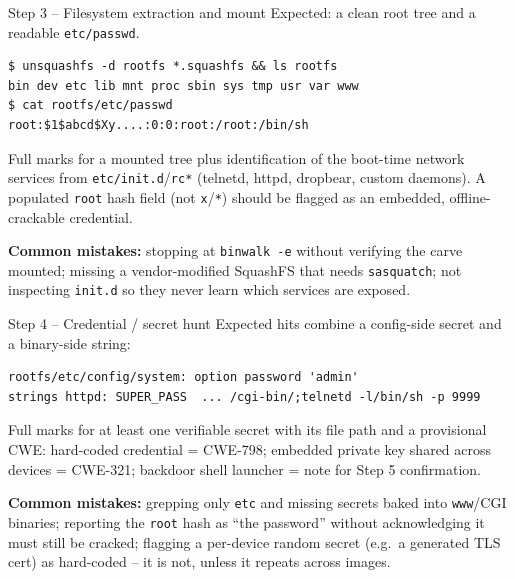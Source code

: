 \documentclass[11pt,a4paper]{article}
\begin{document}
\begin{solutionbox}{Step 3 -- Filesystem extraction and mount}
Expected: a clean root tree and a readable \texttt{etc/passwd}.

\begin{lstlisting}
$ unsquashfs -d rootfs *.squashfs && ls rootfs
bin dev etc lib mnt proc sbin sys tmp usr var www
$ cat rootfs/etc/passwd
root:$1$abcd$Xy....:0:0:root:/root:/bin/sh
\end{lstlisting}

Full marks for a mounted tree plus identification of the boot-time
network services from \texttt{etc/init.d}/\texttt{rc*} (telnetd,
httpd, dropbear, custom daemons). A populated \texttt{root} hash field
(not \texttt{x}/\texttt{*}) should be flagged as an embedded,
offline-crackable credential.

\textbf{Common mistakes:} stopping at \texttt{binwalk -e} without
verifying the carve mounted; missing a vendor-modified SquashFS that
needs \texttt{sasquatch}; not inspecting \texttt{init.d} so they never
learn which services are exposed.
\end{solutionbox}

\begin{solutionbox}{Step 4 -- Credential / secret hunt}
Expected hits combine a config-side secret and a binary-side string:

\begin{lstlisting}
rootfs/etc/config/system: option password 'admin'
strings httpd: SUPER_PASS  ... /cgi-bin/;telnetd -l/bin/sh -p 9999
\end{lstlisting}

Full marks for at least one verifiable secret with its file path and a
provisional CWE: hard-coded credential = CWE-798; embedded private key
shared across devices = CWE-321; backdoor shell launcher = note for
Step 5 confirmation.

\textbf{Common mistakes:} grepping only \texttt{etc} and missing
secrets baked into \texttt{www}/CGI binaries; reporting the
\texttt{root} hash as ``the password'' without acknowledging it must
still be cracked; flagging a per-device random secret (e.g.\ a
generated TLS cert) as hard-coded -- it is not, unless it repeats
across images.
\end{solutionbox}
\end{document}
